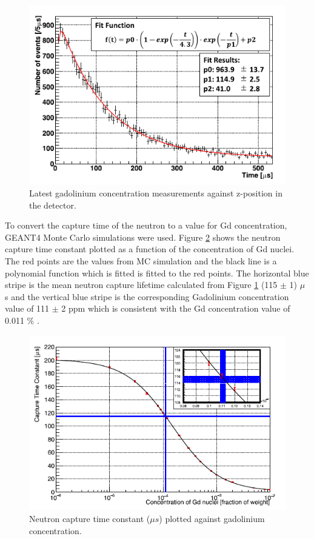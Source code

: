 \begin{figure}[H]
    \includegraphics[width=\textwidth]{Figures/ambe_time.png}
    \caption{Latest gadolinium concentration measurements against z-position in the detector.}
    \label{fig:ambe_time}
\end{figure}

To convert the capture time of the neutron to a value for Gd concentration, GEANT4 Monte Carlo simulations were used. Figure \ref{fig:capturetime_gdconc} shows the neutron capture time constant plotted as a function of the concentration of Gd nuclei. The red points are the values from MC simulation and the black line is a polynomial function which is fitted is fitted to the red points. The horizontal blue stripe is the mean neutron capture lifetime calculated from Figure \ref{fig:ambe_time} (115 $\pm$ 1) $\mu$ s and the vertical blue stripe is the corresponding Gadolinium concentration value of 111 $\pm$ 2 ppm which is consistent with the Gd concentration value of 0.011 \% \cite{abeFirstGadoliniumLoading2021}.

\begin{figure}[H]
    \includegraphics[width=\textwidth]{Figures/capturetime_gdconc.png}
    \caption{Neutron capture time constant ($\mu s$) plotted against gadolinium concentration.}
    \label{fig:capturetime_gdconc}
\end{figure}


